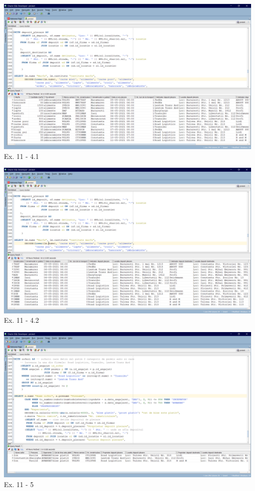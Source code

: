 \documentclass[12pt, a4paper]{article}
\begin{document}
\includegraphics[width=\textwidth]{ex11_4_1.png}
\label{Ex11 4.1}
\centering Ex. 11 - 4.1

\includegraphics[width=\textwidth]{ex11_4_2.png}
\label{Ex11 4.2}
\centering Ex. 11 - 4.2

\includegraphics[width=\textwidth]{ex11_5.png}
\label{Ex11 5}
\centering Ex. 11 - 5
\end{document}
